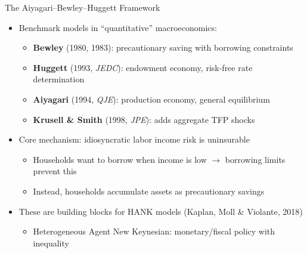 \documentclass[aspectratio=169,11pt]{beamer}
\newcommand{\emphc}[1]{\textcolor{harvardcrimson}{#1}}
\begin{document}
\begin{frame}{The Aiyagari--Bewley--Huggett Framework}
\small
\begin{itemize}\itemsep2pt
    \item Benchmark models in ``quantitative'' macroeconomics:
    \begin{itemize}\itemsep2pt
        \item \textbf{Bewley} (1980, 1983): precautionary saving with borrowing constraints
        \item \textbf{Huggett} (1993, \emph{JEDC}): endowment economy, risk-free rate determination
        \item \textbf{Aiyagari} (1994, \emph{QJE}): production economy, general equilibrium
        \item \textbf{Krusell \& Smith} (1998, \emph{JPE}): adds aggregate TFP shocks
    \end{itemize}
    \item Core mechanism: \emphc{idiosyncratic labor income risk} is \emphc{uninsurable}
    \begin{itemize}
        \item Households want to borrow when income is low $\to$ borrowing limits prevent this
        \item Instead, households accumulate assets as \emphc{precautionary savings}
    \end{itemize}
    \item These are building blocks for \emphc{HANK} models (Kaplan, Moll \& Violante, 2018)
    \begin{itemize}
        \item Heterogeneous Agent New Keynesian: monetary/fiscal policy with inequality
    \end{itemize}
\end{itemize}
\end{frame}
\end{document}

